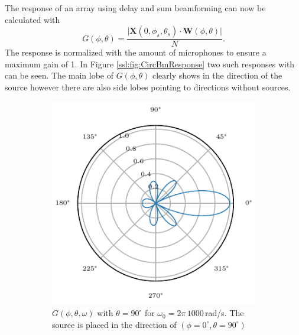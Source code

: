 The response of an array using delay and sum beamforming can
now be calculated with
\begin{equation}
	G(\phi, \theta) =
	\frac{
		\lvert \bm{X}(0, \phi_s, \theta_s) \cdot \bm{W}(\phi, \theta) \rvert}
	{
		N
	}.
\end{equation}
The response is normalized with the amount of microphones to ensure a maximum
gain of 1.
In Figure \ref{ssl:fig:CircBmResponse} two such responses with can be seen.
The main lobe of $G(\phi, \theta)$ clearly shows in the direction of the source
however there are also side lobes pointing to directions without sources.

\begin{figure}[ht]
	\centering
	\begin{subfigure}[t]{0.45\textwidth}
		\centering
		\includegraphics[width=\textwidth]{images/3_source_localization/radial_1200_circ_single.pdf}
		\caption{\(G(\phi, \theta, \omega)\) with $\theta = 90^\circ$ for $\omega_0 = 2\pi \, 1000$\,rad/s.
			The source is placed in the direction of $(\phi=0^\circ, \theta = 90^\circ)$}
		\label{ssl:fig:CircBmPhi}
	\end{subfigure}
	\hfill
	\begin{subfigure}[t]{0.45\textwidth}
		\centering

\end{subfigure}
\end{figure}
